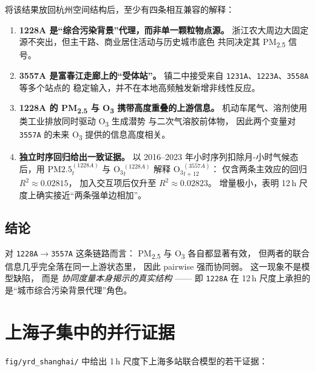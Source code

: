\documentclass[11pt,a4paper]{article}
\begin{document}
将该结果放回杭州空间结构后，至少有四条相互兼容的解释：

\begin{enumerate}[leftmargin=2em]
  \item \textbf{1228A 是“综合污染背景”代理，而非单一颗粒物点源。}
        浙江农大周边大固定源不突出，但主干路、商业居住活动与历史城市底色
        共同决定其 PM\textsubscript{2.5} 信号。
  \item \textbf{3557A 是富春江走廊上的“受体站”。}
        镇二中接受来自 \texttt{1231A}、\texttt{1223A}、\texttt{3558A} 等多个站点的
        稳定输入，并不在本地高频触发新增非线性反应。
  \item \textbf{1228A 的 PM\textsubscript{2.5} 与 O\textsubscript{3} 携带高度重叠的上游信息。}
        机动车尾气、溶剂使用类工业排放同时驱动 O\textsubscript{3} 生成潜势
        与二次气溶胶前体物，
        因此两个变量对 \texttt{3557A} 的未来 O\textsubscript{3} 提供的信息高度相关。
  \item \textbf{独立时序回归给出一致证据。}
        以 2016--2023 年小时序列扣除月-小时气候态后，用
        $\mathrm{PM2.5}_t^{(1228A)}$ 与 $\mathrm{O_3}_t^{(1228A)}$ 解释
        $\mathrm{O_3}_{t+12}^{(3557A)}$：
        仅含两条主效应的回归 $R^2 \approx 0.02815$，
        加入交互项后仅升至 $R^2 \approx 0.02823$。
        增量极小，表明 12\,h 尺度上确实接近“两条强单边相加”。
\end{enumerate}

\subsection{结论}

对 \texttt{1228A$\to$3557A} 这条链路而言：
PM\textsubscript{2.5} 与 O\textsubscript{3} 各自都显著有效，
但两者的联合信息几乎完全落在同一上游状态里，
因此 pairwise 强而协同弱。
这一现象不是模型缺陷，
而是 \emph{协同度量本身揭示的真实结构} ——
即 \texttt{1228A} 在 12\,h 尺度上承担的是“城市综合污染背景代理”角色。

\section{上海子集中的并行证据}

\texttt{fig/yrd\_shanghai/} 中给出 1\,h 尺度下上海多站联合模型的若干证据：
\end{document}
